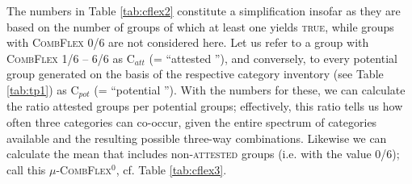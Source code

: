 \documentclass[output=paper,colorlinks,citecolor=brown,draft]{langscibook}
\begin{document}
The numbers in Table \ref{tab:cflex2} constitute a simplification insofar as they are based on the number of  groups of which at least one  yields \textsc{true}, while  groups with \textsc{CombFlex} 0/6 are not considered here. Let us refer to a  group with \textsc{CombFlex} 1/6 -- 6/6 as C$_{att}$ (= ``attested ''), and  conversely, to every potential  group  generated on the basis of the respective category inventory (see Table \ref{tab:tp1}) as  C$_{pot}$ (= ``potential '').  %
With the numbers for these, we can calculate the ratio attested  groups per potential  groups; %
effectively, this ratio tells us how often three categories can co-occur, given the entire spectrum of categories available and the resulting possible three-way combinations. 
Likewise we can calculate the mean  that includes non-\textsc{attested}  groups (i.e. with the value 0/6); call this $\mu$-\textsc{CombFlex}$^0$, cf. Table \ref{tab:cflex3}.



\begin{table}
\caption{Potential and attested combinations; modified combinatorial flexibility }
\label{tab:cflex3}
\end{table} 
\end{document}
